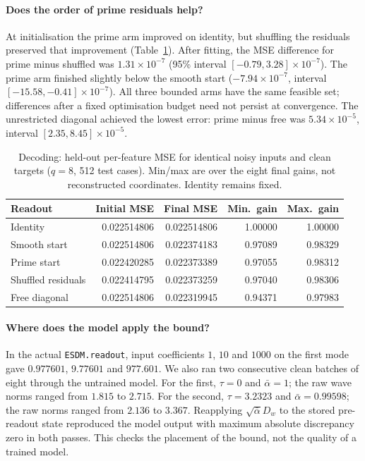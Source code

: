 \documentclass[11pt,a4paper]{article}
\begin{document}
\paragraph{Does the order of prime residuals help?}
At initialisation the prime arm improved on identity, but shuffling the
residuals preserved that improvement (Table~\ref{tab:decoding}). After
fitting, the MSE difference for prime minus shuffled was
$1.31\times10^{-7}$ (95\% interval $[-0.79,3.28]\times10^{-7}$).
The prime arm finished slightly below the smooth start
($-7.94\times10^{-7}$, interval $[-15.58,-0.41]\times10^{-7}$).
All three bounded arms have the same feasible set; differences after a
fixed optimisation budget need not persist at convergence. The unrestricted
diagonal achieved the lowest error: prime minus free was
$5.34\times10^{-5}$, interval $[2.35,8.45]\times10^{-5}$.

\begin{table}[htbp]
\centering
\caption{Decoding: held-out per-feature MSE for identical noisy inputs and
clean targets ($q=8$, 512 test cases). Min/max are over the eight final
gains, not reconstructed coordinates. Identity remains fixed.}
\label{tab:decoding}
\begin{tabular}{@{}lrrrr@{}}
\toprule
Readout & Initial MSE & Final MSE & Min.\ gain & Max.\ gain\\
\midrule
Identity           & 0.022514806 & 0.022514806 & 1.00000 & 1.00000\\
Smooth start       & 0.022514806 & 0.022374183 & 0.97089 & 0.98329\\
Prime start        & 0.022420285 & 0.022373389 & 0.97055 & 0.98312\\
Shuffled residuals & 0.022414795 & 0.022373259 & 0.97040 & 0.98306\\
Free diagonal      & 0.022514806 & 0.022319945 & 0.94371 & 0.97983\\
\bottomrule
\end{tabular}
\end{table}

\paragraph{Where does the model apply the bound?}
In the actual \texttt{ESDM.readout}, input coefficients $1$, $10$ and $1000$
on the first mode gave $0.977601$, $9.77601$ and $977.601$. We also ran two
consecutive clean batches of eight through the untrained model. For the
first, $\tau=0$ and $\bar\alpha=1$; the raw wave norms ranged from $1.815$
to $2.715$. For the second, $\tau=3.2323$ and $\bar\alpha=0.99598$;
the raw norms ranged from $2.136$ to $3.367$. Reapplying
$\sqrt{\bar\alpha}D_w$ to the stored pre-readout state reproduced the model
output with maximum absolute discrepancy zero in both passes. This checks
the placement of the bound, not the quality of a trained model.
\end{document}
